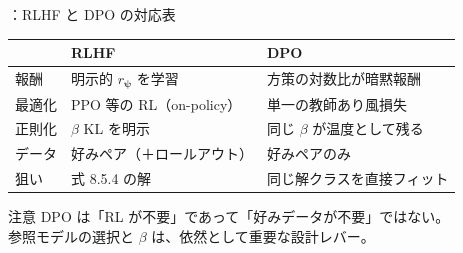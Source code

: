 \assuppl
\begin{frame}{\supplmark：RLHF と DPO の対応表}
    \renewcommand{\arraystretch}{1.25}
    \footnotesize
    \begin{tabular}{lll}
        & \textbf{RLHF} & \textbf{DPO} \\
        \hline
        報酬 & 明示的 $r_{\bm{\psi}}$ を学習 & 方策の対数比が暗黙報酬 \\
        最適化 & PPO 等の RL（on-policy） & 単一の教師あり風損失 \\
        正則化 & $\beta$ KL を明示 & 同じ $\beta$ が温度として残る \\
        データ & 好みペア（＋ロールアウト） & 好みペアのみ \\
        狙い & 式 8.5.4 の解 & 同じ解クラスを直接フィット \\
    \end{tabular}
    \vfill
    \begin{exampleblock}{注意}
        DPO は「RL が不要」であって「好みデータが不要」ではない。\\
        参照モデルの選択と $\beta$ は、依然として重要な設計レバー。
    \end{exampleblock}
\end{frame}
